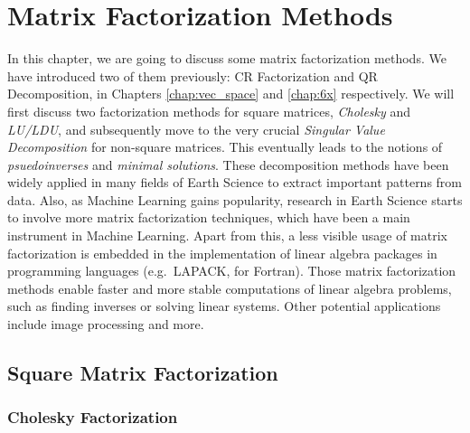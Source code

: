 \chapter{Matrix Factorization Methods}

In this chapter, we are going to discuss some matrix factorization methods. We have introduced two of them previously: CR Factorization and QR Decomposition, in Chapters \ref{chap:vec_space} and \ref{chap:6x} respectively. We will first discuss two factorization methods for square matrices, \textit{Cholesky} and \textit{LU/LDU}, and subsequently move to the very crucial \textit{Singular Value Decomposition} for non-square matrices. This eventually leads to the notions of \textit{psuedoinverses} and \textit{minimal solutions}. These decomposition methods have been widely applied in many fields of Earth Science to extract important patterns from data. Also, as Machine Learning gains popularity, research in Earth Science starts to involve more matrix factorization techniques, which have been a main instrument in Machine Learning. Apart from this, a less visible usage of matrix factorization is embedded in the implementation of linear algebra packages in programming languages (e.g.\ LAPACK, for Fortran). Those matrix factorization methods enable faster and more stable computations of linear algebra problems, such as finding inverses or solving linear systems. Other potential applications include image processing and more.

\section{Square Matrix Factorization}
\subsection{Cholesky Factorization}

